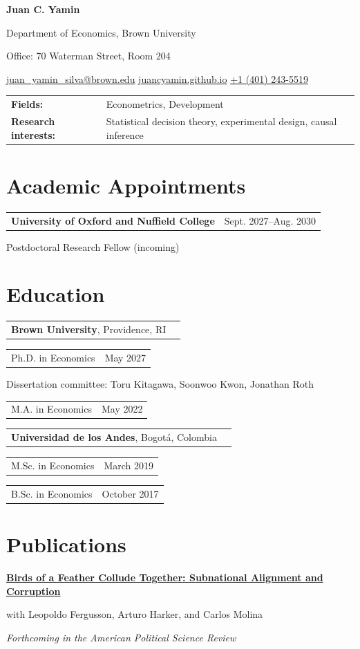 \documentclass[11pt,letterpaper]{article}
\makeatletter
\newcommand{\cvlink}[2]{\href{#1}{#2}}
\newcommand{\datedline}[2]{%
  \noindent\begin{tabularx}{\textwidth}{@{}X>{\raggedleft\arraybackslash}p{1.48in}@{}}%
  #1 & #2
  \end{tabularx}\par
}
\newcommand{\papertitle}[2]{%
  \needspace{3\baselineskip}%
  \textbf{\cvlink{#1}{#2}}\par\vspace{0.13em}%
}
\makeatother
\begin{document}
\fontsize{11}{13.7}\selectfont

\begin{center}
  {\fontsize{24}{27}\selectfont\bfseries Juan C. Yamin}\par
  \vspace{0.14em}
  Department of Economics, Brown University\par
  Office: 70 Waterman Street, Room 204\par
  \cvlink{mailto:juan_yamin_silva@brown.edu}{juan\_yamin\_silva@brown.edu}
  \;\textbar\;
  \cvlink{https://juancyamin.github.io/}{juancyamin.github.io}
  \;\textbar\;
  \cvlink{tel:+14012435519}{+1 (401) 243-5519}\par
\end{center}
\vspace{-0.20em}

\begin{tabularx}{\textwidth}{@{}>{\bfseries}p{1.62in}X@{}}
Fields: & Econometrics, Development \\
Research interests: & Statistical decision theory, experimental design, causal inference \\
\end{tabularx}\par

\section{Academic Appointments}
\datedline{\textbf{University of Oxford and Nuffield College}}{Sept. 2027--Aug. 2030}
Postdoctoral Research Fellow (incoming)\par

\section{Education}
\datedline{\textbf{Brown University}, Providence, RI}{}
\datedline{Ph.D. in Economics}{May 2027}
{\leftskip=0.18in\fontsize{10}{12}\selectfont\color{mutedink}Dissertation committee: Toru Kitagawa, Soonwoo Kwon, Jonathan Roth\par}
\vspace{0.20em}
\datedline{M.A. in Economics}{May 2022}
\vspace{0.25em}
\datedline{\textbf{Universidad de los Andes}, Bogot\'a, Colombia}{}
\datedline{M.Sc. in Economics}{March 2019}
\datedline{B.Sc. in Economics}{October 2017}

\section{Publications}
\papertitle{https://juancyamin.github.io/files/subnational-alignment-corruption.pdf}{Birds of a Feather Collude Together: Subnational Alignment and Corruption}
with Leopoldo Fergusson, Arturo Harker, and Carlos Molina\par
\textit{Forthcoming in the American Political Science Review}\par\vspace{0.13em}
\end{document}
